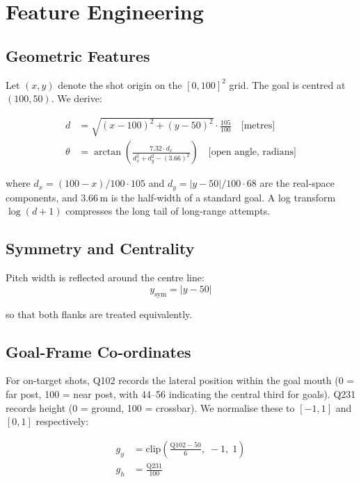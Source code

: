 \documentclass[12pt,a4paper]{article}
\begin{document}
\section{Feature Engineering}
\label{sec:features}

\subsection{Geometric Features}

Let $(x, y)$ denote the shot origin on the $[0,100]^2$ grid. The goal is centred at $(100, 50)$. We derive:

\begin{align}
d &= \sqrt{(x - 100)^2 + (y - 50)^2} \cdot \frac{105}{100} \quad \text{[metres]} \label{eq:distance} \\[4pt]
\theta &= \arctan\!\left(\frac{7.32 \cdot d_x}{d_x^2 + d_y^2 - (3.66)^2}\right) \quad \text{[open angle, radians]} \label{eq:angle}
\end{align}

where $d_x = (100 - x)/100 \cdot 105$ and $d_y = |y - 50|/100 \cdot 68$ are the real-space components, and $3.66\,\text{m}$ is the half-width of a standard goal. A log transform $\log(d + 1)$ compresses the long tail of long-range attempts.

\subsection{Symmetry and Centrality}

Pitch width is reflected around the centre line:
\begin{equation}
y_{\text{sym}} = \left|y - 50\right|
\end{equation}

so that both flanks are treated equivalently.

\subsection{Goal-Frame Co-ordinates}

For on-target shots, Q102 records the lateral position within the goal mouth (0 = far post, 100 = near post, with 44--56 indicating the central third for goals). Q231 records height (0 = ground, 100 = crossbar). We normalise these to $[-1, 1]$ and $[0, 1]$ respectively:

\begin{align}
g_y &= \text{clip}\!\left(\frac{\text{Q102} - 50}{6},\; -1,\; 1\right) \label{eq:gy} \\[4pt]
g_h &= \frac{\text{Q231}}{100} \label{eq:gh}
\end{align}
\end{document}
